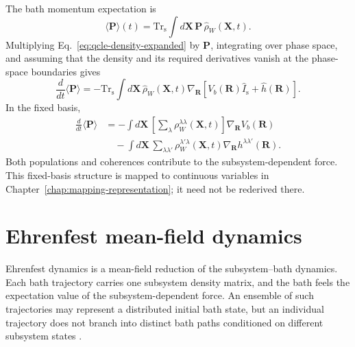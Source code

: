 \documentclass[
  11pt,
  letterpaper,
  onehalfspacing,
  normalmargins,
  equalmargins,
  oneside
]{ut-thesis}
\begin{document}
The bath momentum expectation is
\begin{equation}
\langle\mathbf P\rangle(t)
=
\mathrm{Tr}_{\mathrm s}
\int d\mathbf X\,
\mathbf P\,
\hat\rho_W(\mathbf X,t).
\label{eq:qcle-bath-momentum-expectation}
\end{equation}
Multiplying Eq.~\eqref{eq:qcle-density-expanded} by \(\mathbf P\), integrating
over phase space, and assuming that the density and its required derivatives
vanish at the phase-space boundaries gives
\begin{equation}
\frac{d}{dt}
\langle\mathbf P\rangle
=
-
\mathrm{Tr}_{\mathrm s}
\int d\mathbf X\,
\hat\rho_W(\mathbf X,t)
\nabla_{\mathbf R}
\left[
V_b(\mathbf R)\hat I_{\mathrm s}
+
\hat h(\mathbf R)
\right].
\label{eq:qcle-bath-back-reaction-operator}
\end{equation}
In the fixed basis,
\begin{align}
\frac{d}{dt}
\langle\mathbf P\rangle
&=
-
\int d\mathbf X\,
\left[
\sum_\lambda
\rho_W^{\lambda\lambda}(\mathbf X,t)
\right]
\nabla_{\mathbf R}V_b(\mathbf R)
\nonumber\\
&\quad
-
\int d\mathbf X\,
\sum_{\lambda\lambda'}
\rho_W^{\lambda'\lambda}(\mathbf X,t)
\nabla_{\mathbf R}
h^{\lambda\lambda'}(\mathbf R).
\label{eq:qcle-bath-back-reaction-subsystem}
\end{align}
Both populations and coherences contribute to the subsystem-dependent force.
This fixed-basis structure is mapped to continuous variables in
Chapter~\ref{chap:mapping-representation}; it need not be rederived there.


\section{Ehrenfest mean-field dynamics}
\label{sec:ehrenfest-mean-field-dynamics}

Ehrenfest dynamics is a mean-field reduction of the subsystem--bath dynamics.
Each bath trajectory carries one subsystem density matrix, and the bath feels
the expectation value of the subsystem-dependent force. An ensemble of such
trajectories may represent a distributed initial bath state, but an individual
trajectory does not branch into distinct bath paths conditioned on different
subsystem states \cite{Kapral2006ARPC,Curchod2018ChemRev}.
\end{document}
